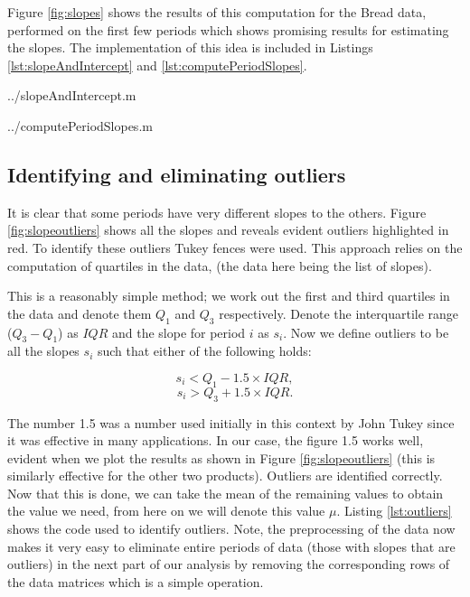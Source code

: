 Figure \ref{fig:slopes} shows the results of this computation for the Bread data, performed on the first few periods which shows promising results for estimating the slopes. The implementation of this idea is included in Listings \ref{lst:slopeAndIntercept} and \ref{lst:computePeriodSlopes}.


    {../slopeAndIntercept.m}
   
    {../computePeriodSlopes.m}




\subsection{Identifying and eliminating outliers}

It is clear that some periods have very different slopes to the others. Figure \ref{fig:slopeoutliers} shows all the slopes and reveals evident outliers highlighted in red. To identify these outliers Tukey fences \cite{tukey} were used. This approach relies on the computation of quartiles in the data, (the data here being the list of slopes).


This is a reasonably simple method; we work out the first and third quartiles in the data and denote them $Q_1$ and $Q_3$ respectively. Denote the interquartile range ($Q_3 - Q_1$)  as $IQR$ and the slope for period $i$ as $s_i$. Now we define outliers to be all the slopes $s_i$ such that either of the following holds:

$$
s_i < Q_1 - 1.5 \times IQR,
$$
$$
s_i > Q_3 + 1.5 \times IQR .
$$

The number 1.5 was a number used initially in this context by John Tukey \cite{tukey} since it was effective in many applications. In our case, the figure 1.5 works well, evident when we plot the results as shown in Figure \ref{fig:slopeoutliers} (this is similarly effective for the other two products). Outliers are identified correctly. Now that this is done, we can take the mean of the remaining values to obtain the value we need, from here on we will denote this value $\mu$. Listing \ref{lst:outliers} shows the code used to identify outliers. Note, the preprocessing of the data now makes it very easy to eliminate entire periods of data (those with slopes that are outliers) in the next part of our analysis by removing the corresponding rows of the data matrices which is a simple operation.

